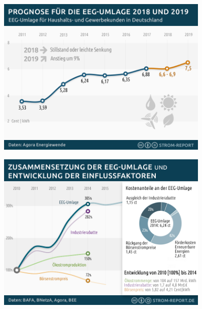 \documentclass[aspectratio=1610, professionalfonts, 9pt]{beamer}
\begin{document}
{
\begin{frame}
  \begin{figure}
  \includegraphics[width=0.9\textwidth]{images/eeg-umlage-2018-2019.png}
  \end{figure}
\end{frame}
}




{
\begin{frame}
  \begin{figure}
  \includegraphics[width=0.9\textwidth]{images/eeg-umlage.png}
  \end{figure}
\end{frame}
}
\end{document}

